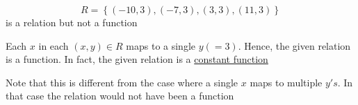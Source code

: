 \documentclass[14pt,fleqn]{extarticle}
\begin{document}
 
\begin{snippet}
    
    \incorrect
    
    \[ R = \left\lbrace (-10,3), (-7,3), (3,3), (11,3) \right\rbrace\]
    is a relation but not a function 
    \reason
    
    Each $x$ in each $(x,y)\in R$ maps to a single $y (=3)$. Hence, the given relation is a function. In fact, the given relation is a \underline{constant function} \newline 
    
    Note that this is different from the case where a single $x$ maps to multiple $y's$. In that case the relation would not have been a function
    
\end{snippet} 
\end{document}
